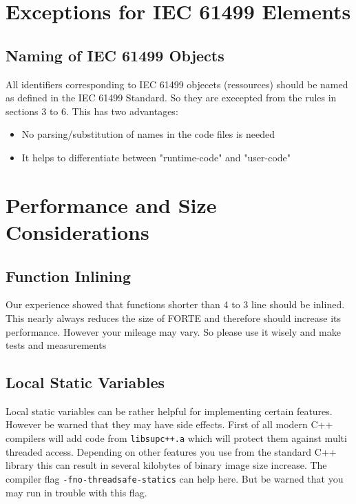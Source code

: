 \documentclass[final,a4paper,10pt, oneside]{article}
\begin{document}
\section{Exceptions for IEC 61499 Elements}

\subsection{Naming of IEC 61499 Objects}

All identifiers corresponding to IEC 61499 objecets (ressources) should be named as defined
in the IEC 61499 Standard. So they are execepted from the rules in sections 3 to 6. This has two advantages:
\begin{itemize}
\item No parsing/substitution of names in the code files is needed
\item It helps to differentiate between "runtime-code" and "user-code"
\end{itemize}

\section{Performance and Size Considerations}



\subsection{Function Inlining}
Our experience showed that functions shorter than 4 to 3 line should be inlined. This nearly always reduces the size of FORTE and therefore should increase its performance. However your mileage may vary. So please use it wisely and make tests and measurements


\subsection{Local Static Variables}
Local static variables can be rather helpful for implementing certain features. However be warned that they may have side effects. First of all modern C++ compilers will add code from \verb=libsupc++.a= which will protect them against multi threaded access. Depending on other features you use from the standard C++ library this can result in several kilobytes of binary image size increase. The compiler flag \verb=-fno-threadsafe-statics= can help here. But be warned that you may run in trouble with this flag. 
\end{document}
